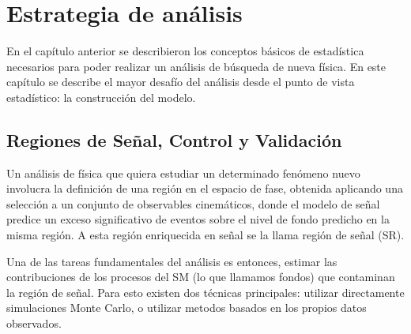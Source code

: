 \chapter{Estrategia de análisis}

En el capítulo anterior se describieron los conceptos básicos de estadística
necesarios para poder realizar un análisis de búsqueda de nueva física. En este
capítulo se describe el mayor desafío del análisis desde el punto de vista
estadístico: la construcción del modelo. %


\section{Regiones de Señal, Control y Validación}

Un análisis de física que quiera estudiar un determinado fenómeno nuevo
involucra la definición de una región en el espacio de fase, obtenida aplicando
una selección a un conjunto de observables cinemáticos, donde el modelo de señal
predice un exceso significativo de eventos sobre el nivel de fondo predicho en
la misma región. A esta región enriquecida en señal se la llama región de señal
(SR).

Una de las tareas fundamentales del análisis es entonces, estimar las
contribuciones de los procesos del SM (lo que llamamos fondos) que contaminan la región de
señal.
Para esto existen dos técnicas principales: utilizar directamente simulaciones Monte Carlo,
o utilizar metodos basados en los propios datos observados.


